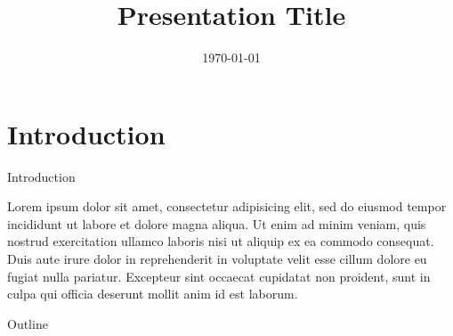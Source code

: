 \documentclass{beamer}
\title[Presentation]{Presentation Title}
\author[Dogan]
{%
   \texorpdfstring{
        \begin{columns}
            \column{.45\linewidth}
            \centering
            Haluk Dogan\\
            \scriptsize{\texttt{\href{mailto:hlk.dogan@gmail.com}{hlk.dogan@gmail.com}}}
        \end{columns}
   }
   {Dogan}
}
\institute[UNL] %
{
  
  Department of Electrical and Computer Engineering\\
  University of Nebraska-Lincoln
}
\date[\today] %
{\today}
\begin{document}
  \begin{frame}\titlepage
  \end{frame}
  
  
  \section{Introduction}
  \begin{frame}{Introduction}

  Lorem ipsum dolor sit amet, consectetur adipisicing elit, sed do eiusmod
  tempor incididunt ut labore et dolore magna aliqua. Ut enim ad minim veniam,
  quis nostrud exercitation ullamco laboris nisi ut aliquip ex ea commodo
  consequat. Duis aute irure dolor in reprehenderit in voluptate velit esse
  cillum dolore eu fugiat nulla pariatur. Excepteur sint occaecat cupidatat non
  proident, sunt in culpa qui officia deserunt mollit anim id est laborum.

  \end{frame}

  \begin{frame}{Outline}
    \tableofcontents
  \end{frame}
\end{document}
